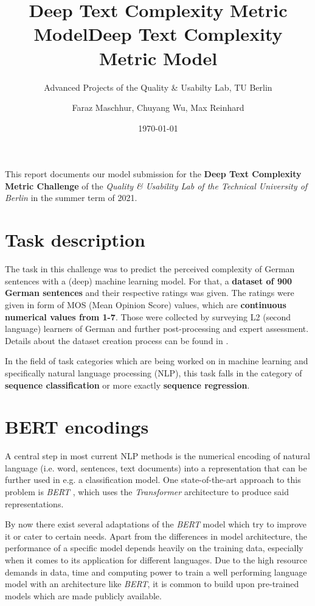 \documentclass[11pt, DIV12]{scrartcl}
\title{\vspace*{-1.5\baselineskip}
	Deep Text Complexity Metric Model}
\subtitle{Advanced Projects of the Quality \& Usabilty Lab, TU Berlin\vspace*{-0.5\baselineskip}}
\author{Faraz Maschhur, Chuyang Wu, Max Reinhard}
\date{\large\today\vspace*{-1.5\baselineskip}}
\begin{document}
\maketitle
\title{Deep Text Complexity Metric Model}

This report documents our model submission for the \textbf{Deep Text Complexity Metric Challenge} of the \emph{Quality \& Usability Lab of the Technical University of Berlin} in the summer term of 2021.

\vspace*{-0.5\baselineskip}
\section{Task description}
\vspace*{-0.5\baselineskip}

The task in this challenge was to predict the perceived complexity of German sentences with a (deep) machine learning model. For that, a \textbf{dataset of 900 German sentences} and their respective ratings was given. The ratings were given in form of MOS (Mean Opinion Score) values, which are \textbf{continuous numerical values from 1-7}. Those were collected by surveying L2 (second language) learners of German and further post-processing and expert assessment. Details about the dataset creation process can be found in \cite{DBLP:journals/corr/abs-1904-07733}.

In the field of task categories which are being worked on in machine learning and specifically natural language processing (NLP), this task falls in the category of \textbf{sequence classification} or more exactly \textbf{sequence regression}.

\vspace*{-0.5\baselineskip}
\section{BERT encodings}
\vspace*{-0.5\baselineskip}

A central step in most current NLP methods is the numerical encoding of natural language (i.e. word, sentences, text documents) into a representation that can be further used in e.g. a classification model. One state-of-the-art approach to this problem is \textit{BERT} \cite{DBLP:journals/corr/abs-1810-04805}, which uses the \textit{Transformer} \cite{DBLP:journals/corr/VaswaniSPUJGKP17}  architecture to produce said representations. 

By now there exist several adaptations of the \textit{BERT} model which try to improve it or cater to certain needs. Apart from the differences in model architecture, the performance of a specific model depends heavily on the training data, especially when it comes to its application for different languages. Due to the high resource demands in data, time and computing power to train a well performing language model with an architecture like \textit{BERT}, it is common to build upon pre-trained models which are made publicly available.
\end{document}

